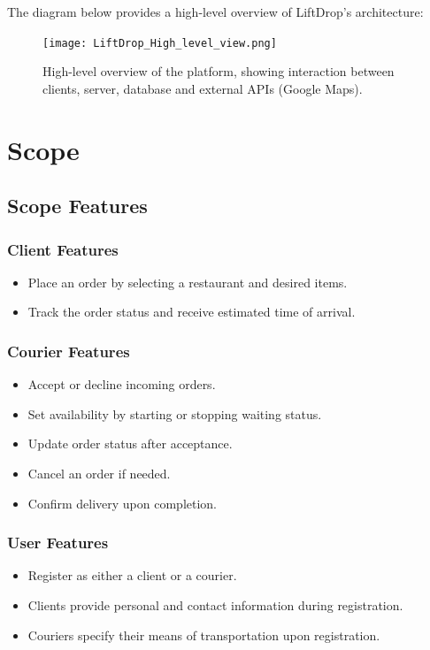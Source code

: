 \documentclass[a4paper,twoside,11pt]{article}
\begin{document}
\vspace{5mm}

The diagram below provides a high-level overview of LiftDrop's architecture:

\vspace{3mm}

\begin{figure}[h]
    \centering
    \texttt{[image: LiftDrop\_High\_level\_view.png]}
    \caption{High-level overview of the platform, showing interaction between clients, server, database and external APIs (Google Maps).}
    \label{fig:high_level}
\end{figure}

\newpage

\section{Scope}

\subsection{Scope Features}  

\subsubsection{Client Features}  
\begin{itemize}
    \item Place an order by selecting a restaurant and desired items.
    \item Track the order status and receive estimated time of arrival.
\end{itemize}

\subsubsection{Courier Features}  
\begin{itemize}
    \item Accept or decline incoming orders.
    \item Set availability by starting or stopping waiting status.
    \item Update order status after acceptance.
    \item Cancel an order if needed.
    \item Confirm delivery upon completion.
\end{itemize}

\subsubsection{User Features}  
\begin{itemize}
    \item Register as either a client or a courier.
    \item Clients provide personal and contact information during registration.
    \item Couriers specify their means of transportation upon registration.
\end{itemize}
  
\end{document}
